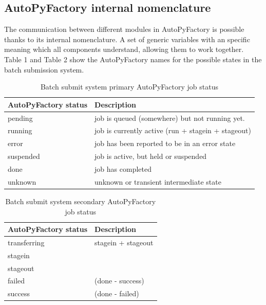 \documentclass[a4paper]{jpconf}
\begin{document}
\subsection{AutoPyFactory internal nomenclature}

The communication between different modules in AutoPyFactory 
is possible thanks to its internal nomenclature.
A set of generic variables with an specific meaning which all components 
understand, allowing them to work together. 
Table 1 and Table 2 show the AutoPyFactory names for the
possible states in the batch submission system. 

\begin{table}
   \begin{center}
      \begin{tabular}{l l}
         \hline
         \textbf{AutoPyFactory status} & \textbf{Description} \\ 
         \hline
         pending      &     job is queued (somewhere) but not running yet.      \\  
         running      &     job is currently active (run + stagein + stageout)  \\ 
         error        &     job has been reported to be in an error state       \\ 
         suspended    &     job is active, but held or suspended                \\ 
         done         &     job has completed                                   \\ 
         unknown      &     unknown or transient intermediate state             \\ 
         \hline
      \end{tabular}
   \end{center}
   \caption{Batch submit system primary AutoPyFactory job status}
   \label{job secondary status}
\end{table}

\begin{table}
   \begin{center}
      \begin{tabular}{l l}
         \hline
         \textbf{AutoPyFactory status} & \textbf{Description}  \\ 
         \hline
         transferring  &     stagein + stageout  \\ 
         stagein       &                         \\ 
         stageout      &                         \\ 
         failed        &     (done - success)    \\ 
         success       &     (done - failed)     \\ 
         \hline
      \end{tabular}
   \end{center}
   \caption{Batch submit system secondary AutoPyFactory job status} 
   \label{job secondary status}
\end{table}
\end{document}
